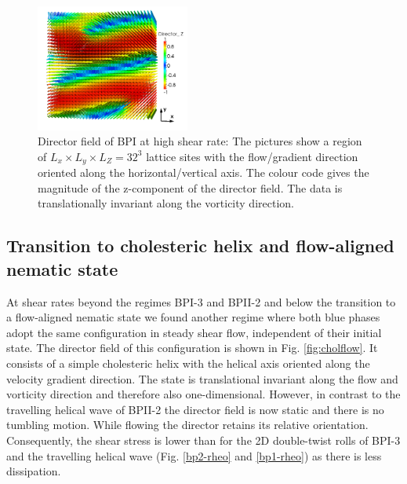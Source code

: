 \documentclass[aps,pre,reprint,superscriptaddress, twocolumn]{revtex4}
\begin{document}
\begin{figure}[htpb]
\includegraphics[width=0.45\textwidth]{dir3d-z-302k_run916.png}
\caption{Director field of BPI at high shear rate: The pictures show a region 
of $L_x\times L_y \times L_Z= 32^3$ lattice sites with the flow/gradient 
direction oriented along the horizontal/vertical axis. 
The colour code gives the magnitude of the z-component of the director field. 
The data is translationally invariant along the vorticity direction.}
\label{bp1-high}
\end{figure}

\subsection{Transition to cholesteric helix and flow-aligned nematic state}\label{cholflow}


At shear rates beyond the regimes BPI-3 and BPII-2 and below the transition to a 
flow-aligned nematic state we found another regime where 
both blue phases adopt the same configuration in steady shear flow, 
independent of their initial state.
The director field of this configuration is shown in Fig. \ref{fig:cholflow}.
It consists of a simple cholesteric helix with the helical axis oriented 
along the velocity gradient direction. The state is translational invariant 
along the flow and vorticity direction and therefore also one-dimensional. 
However, in contrast to the travelling helical wave of BPII-2 the 
director field is now static and there is no tumbling motion. 
While flowing the director retains its relative orientation.
Consequently, the shear stress is lower than for
the 2D double-twist rolls of BPI-3 and the travelling helical wave
(Fig. \ref{bp2-rheo} and \ref{bp1-rheo}) as there is less dissipation.
 
\end{document}
